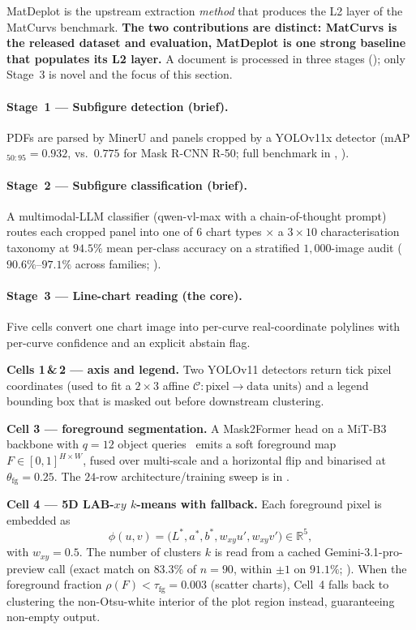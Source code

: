 \documentclass{article}
\begin{document}
MatDeplot is the upstream extraction \emph{method} that produces
the L2 layer of the MatCurvs benchmark. \textbf{The two
contributions are distinct: MatCurvs is the released dataset
and evaluation, MatDeplot is one strong baseline that populates
its L2 layer.} A document is processed in three stages
(); only Stage~3 is novel and the focus of this
section.

\paragraph{Stage~1 --- Subfigure detection (brief).}
PDFs are parsed by MinerU and panels cropped by a YOLOv11x
detector (mAP$_{50:95}{=}0.932$, vs.\ $0.775$ for Mask R-CNN
R-50; full benchmark in , ).

\paragraph{Stage~2 --- Subfigure classification (brief).}
A multimodal-LLM classifier (qwen-vl-max with a chain-of-thought
prompt) routes each cropped panel into one of $6$ chart types
$\times$ a $3{\times}10$ characterisation taxonomy at $94.5\%$
mean per-class accuracy on a stratified $1{,}000$-image audit
($90.6\%\text{--}97.1\%$ across families; ).

\paragraph{Stage~3 --- Line-chart reading (the core).}
Five cells convert one chart image into per-curve real-coordinate
polylines with per-curve confidence and an explicit abstain flag.

\textbf{Cells 1\,\&\,2 --- axis and legend.} Two YOLOv11 detectors
return tick pixel coordinates (used to fit a $2{\times}3$ affine
$\mathcal{C}\!:\!\text{pixel}\!\to\!\text{data units}$) and a
legend bounding box that is masked out before downstream
clustering.

\textbf{Cell 3 --- foreground segmentation.} A Mask2Former head on
a MiT-B3 backbone with $q{=}12$ object queries~\citep{mask2former,mitb3}
emits a soft foreground map $F\in[0,1]^{H\times W}$, fused over
multi-scale and a horizontal flip and binarised at
$\theta_{\mathrm{fg}}{=}0.25$. The $24$-row architecture/training
sweep is in .

\textbf{Cell 4 --- 5D LAB-$xy$ $k$-means with fallback.} Each
foreground pixel is embedded as
\begin{equation}
  \label{eq:5dfeat}
  \phi(u,v)=\bigl(L^*, a^*, b^*, w_{xy}u', w_{xy}v'\bigr)\in\mathbb{R}^{5},
\end{equation}
with $w_{xy}{=}0.5$. The number of clusters $k$ is read from a
cached Gemini-3.1-pro-preview call (exact match on $83.3\%$ of
$n{=}90$, within $\pm 1$ on $91.1\%$; ). When the
foreground fraction $\rho(F){<}\tau_{\mathrm{fg}}{=}0.003$
(scatter charts), Cell~4 falls back to clustering the
non-Otsu-white interior of the plot region instead, guaranteeing
non-empty output.
\end{document}
